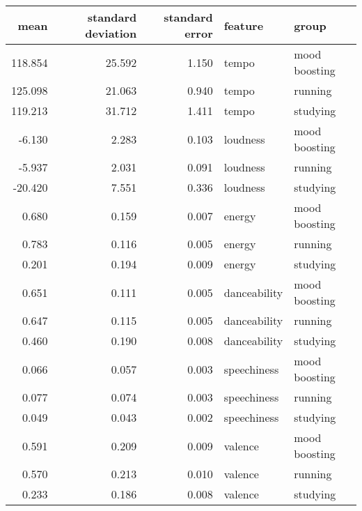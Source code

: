 \begin{tabular}{rrrll}
\toprule
    mean &  standard deviation &  standard error &       feature &          group \\
\midrule
 118.854 &              25.592 &           1.150 &         tempo &  mood boosting \\
 125.098 &              21.063 &           0.940 &         tempo &        running \\
 119.213 &              31.712 &           1.411 &         tempo &       studying \\
  -6.130 &               2.283 &           0.103 &      loudness &  mood boosting \\
  -5.937 &               2.031 &           0.091 &      loudness &        running \\
 -20.420 &               7.551 &           0.336 &      loudness &       studying \\
   0.680 &               0.159 &           0.007 &        energy &  mood boosting \\
   0.783 &               0.116 &           0.005 &        energy &        running \\
   0.201 &               0.194 &           0.009 &        energy &       studying \\
   0.651 &               0.111 &           0.005 &  danceability &  mood boosting \\
   0.647 &               0.115 &           0.005 &  danceability &        running \\
   0.460 &               0.190 &           0.008 &  danceability &       studying \\
   0.066 &               0.057 &           0.003 &   speechiness &  mood boosting \\
   0.077 &               0.074 &           0.003 &   speechiness &        running \\
   0.049 &               0.043 &           0.002 &   speechiness &       studying \\
   0.591 &               0.209 &           0.009 &       valence &  mood boosting \\
   0.570 &               0.213 &           0.010 &       valence &        running \\
   0.233 &               0.186 &           0.008 &       valence &       studying \\
\bottomrule
\end{tabular}
